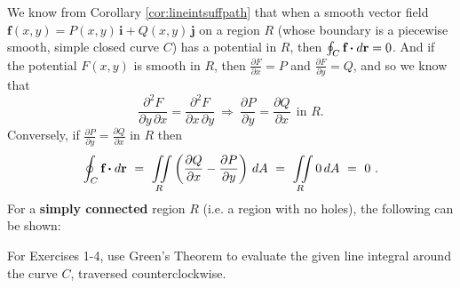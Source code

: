 We know from Corollary \ref{cor:lineintsuffpath} that when a smooth vector field
$\textbf{f}(x,y) = P(x,y)\,\textbf{i} + Q(x,y)\,\textbf{j}$ on a region $R$ (whose boundary is a piecewise smooth,
simple closed curve $C$) has a potential in $R$, then $\oint_{C} \textbf{f} \bm{\cdot} d\textbf{r} = 0$. And if the potential
$F(x,y)$ is smooth in $R$, then
$\frac{\partial F}{\partial x} = P$ and $\frac{\partial F}{\partial y} = Q$, and so we know that
\begin{displaymath}
 \frac{\partial^2 F}{\partial y \,\partial x} = \frac{\partial^2 F}{\partial x \,\partial y} ~\Rightarrow~
 \frac{\partial P}{\partial y} = \frac{\partial Q}{\partial x} ~~\text{in $R$.}
\end{displaymath}
Conversely, if $\frac{\partial P}{\partial y} = \frac{\partial Q}{\partial x}$ in $R$ then
\begin{displaymath}
 \oint_{C} \textbf{f} \bm{\cdot} d\textbf{r} ~=~ \iint\limits_{R} \left( \frac{\partial Q}{\partial x} -
   \frac{\partial P}{\partial y} \right)\,dA ~=~ \iint\limits_{R} 0\,dA ~=~ 0 ~.
\end{displaymath}
For a \textbf{simply connected} region $R$ (i.e. a region with no holes), the following can be
shown:\vspace{3mm}
\newpage
\centerline{}\label{sec4dot3}
\par\noindent For Exercises 1-4, use Green's Theorem to evaluate the given line integral around the curve $C$, traversed
counterclockwise.
